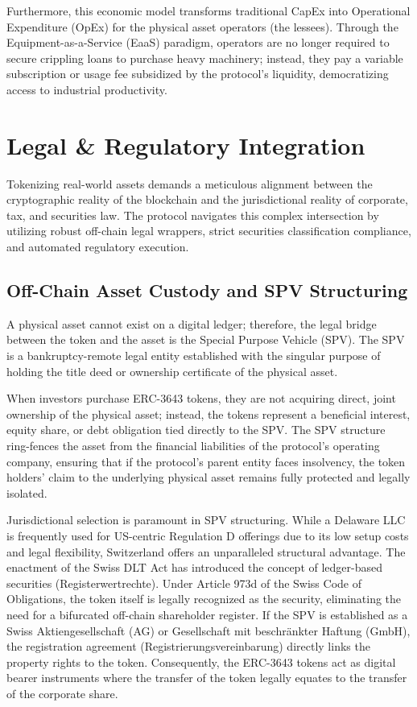 \documentclass[12pt, a4paper]{article}
\begin{document}
Furthermore, this economic model transforms traditional CapEx into Operational Expenditure (OpEx) for the physical asset operators (the lessees). Through the Equipment-as-a-Service (EaaS) paradigm, operators are no longer required to secure crippling loans to purchase heavy machinery; instead, they pay a variable subscription or usage fee subsidized by the protocol's liquidity, democratizing access to industrial productivity.

\section{Legal \& Regulatory Integration}
Tokenizing real-world assets demands a meticulous alignment between the cryptographic reality of the blockchain and the jurisdictional reality of corporate, tax, and securities law. The protocol navigates this complex intersection by utilizing robust off-chain legal wrappers, strict securities classification compliance, and automated regulatory execution.

\subsection{Off-Chain Asset Custody and SPV Structuring}
A physical asset cannot exist on a digital ledger; therefore, the legal bridge between the token and the asset is the Special Purpose Vehicle (SPV). The SPV is a bankruptcy-remote legal entity established with the singular purpose of holding the title deed or ownership certificate of the physical asset.

When investors purchase ERC-3643 tokens, they are not acquiring direct, joint ownership of the physical asset; instead, the tokens represent a beneficial interest, equity share, or debt obligation tied directly to the SPV. The SPV structure ring-fences the asset from the financial liabilities of the protocol's operating company, ensuring that if the protocol's parent entity faces insolvency, the token holders' claim to the underlying physical asset remains fully protected and legally isolated.

Jurisdictional selection is paramount in SPV structuring. While a Delaware LLC is frequently used for US-centric Regulation D offerings due to its low setup costs and legal flexibility, Switzerland offers an unparalleled structural advantage. The enactment of the Swiss DLT Act has introduced the concept of ledger-based securities (Registerwertrechte). Under Article 973d of the Swiss Code of Obligations, the token itself is legally recognized as the security, eliminating the need for a bifurcated off-chain shareholder register. If the SPV is established as a Swiss Aktiengesellschaft (AG) or Gesellschaft mit beschränkter Haftung (GmbH), the registration agreement (Registrierungsvereinbarung) directly links the property rights to the token. Consequently, the ERC-3643 tokens act as digital bearer instruments where the transfer of the token legally equates to the transfer of the corporate share.
\end{document}

